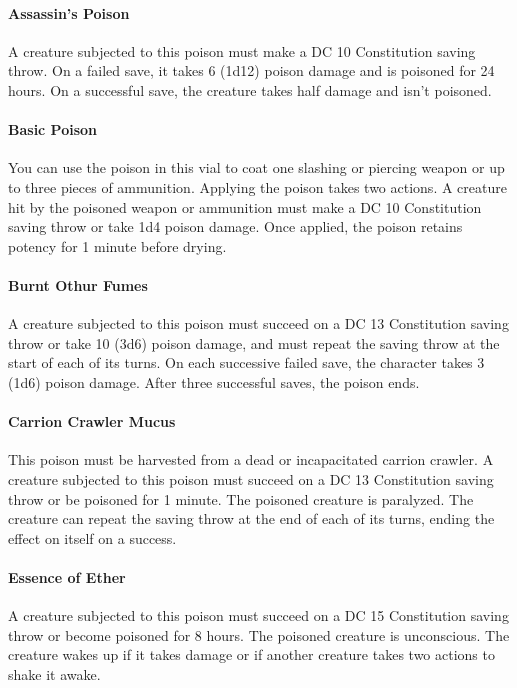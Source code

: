     \paragraph{Assassin's Poison}
        A creature subjected to this poison must make a DC 10 Constitution saving throw.
        On a failed save, it takes 6 (1d12) poison damage and is poisoned for 24 hours.
        On a successful save, the creature takes half damage and isn't poisoned.
    \paragraph{Basic Poison} \label{item::basicpoison}
        You can use the poison in this vial to coat one slashing or piercing weapon or up to three pieces of ammunition.
        Applying the poison takes two actions.
        A creature hit by the poisoned weapon or ammunition must make a DC 10 Constitution saving throw or take 1d4 poison damage.
        Once applied, the poison retains potency for 1 minute before drying.
    \paragraph{Burnt Othur Fumes}
        A creature subjected to this poison must succeed on a DC 13 Constitution saving throw or take 10 (3d6) poison damage, and must repeat the saving throw at the start of each of its turns.
        On each successive failed save, the character takes 3 (1d6) poison damage.
        After three successful saves, the poison ends.
    \paragraph{Carrion Crawler Mucus}
        This poison must be harvested from a dead or incapacitated carrion crawler.
        A creature subjected to this poison must succeed on a DC 13 Constitution saving throw or be poisoned for 1 minute.
        The poisoned creature is paralyzed.
        The creature can repeat the saving throw at the end of each of its turns, ending the effect on itself on a success.
    \paragraph{Essence of Ether}
        A creature subjected to this poison must succeed on a DC 15 Constitution saving throw or become poisoned for 8 hours.
        The poisoned creature is unconscious.
        The creature wakes up if it takes damage or if another creature takes two actions to shake it awake.
